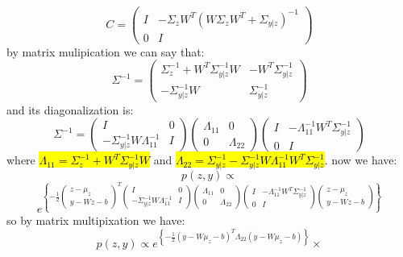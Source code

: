 \begin{qsolve}
\begin{qsolve}[]
		$$ C = \begin{pmatrix} I & -\Sigma_zW^T(W\Sigma_zW^T + \Sigma_{y|z})^{-1} \\ 0 & I \end{pmatrix}$$
		by matrix mulipication we can say that:
		$$\Sigma^{-1} = \begin{pmatrix}
			\Sigma_z^{-1} + W^T\Sigma_{y|z}^{-1}W & -W^T \Sigma_{y|z}^{-1} \\
			-\Sigma_{y|z}^{-1}W & \Sigma_{y|z}^{-1}
		\end{pmatrix}
		$$
		\splitqsolve[\splitqsolve]
		and its diagonalization is:
		$$\Sigma^{-1} = \begin{pmatrix}
			I & 0 \\
			-\Sigma_{y|z}^{-1}W\Lambda_{11}^{-1} & I
		\end{pmatrix} \begin{pmatrix}
			\Lambda_{11} & 0 \\
			0 & \Lambda_{22}
		\end{pmatrix} \begin{pmatrix}
			I & -\Lambda_{11}^{-1} W^T \Sigma_{y|z}^{-1} \\
			0 & I
		\end{pmatrix}$$
		where \hl{$\Lambda_{11} = \Sigma_z^{-1} + W^T\Sigma_{y|z}^{-1}W$} and \hl{$\Lambda_{22} = \Sigma_{y|z}^{-1}- \Sigma_{y|z}^{-1}W\Lambda_{11}^{-1}W^T\Sigma_{y|z}^{-1}$}.
		now we have:
		$$p(z,y)\propto$$
		$$  e^{\left\{-\frac{1}{2} \begin{pmatrix}
			z - \mu_z \\ y - Wz - b
		\end{pmatrix} ^T \begin{pmatrix}
			I & 0 \\ -\Sigma_{y|z}^{-1}W\Lambda_{11}^{-1} & I
		\end{pmatrix} \begin{pmatrix}
			\Lambda_{11} & 0 \\ 0 & \Lambda_{22}
		\end{pmatrix} \begin{pmatrix}
			I & -\Lambda_{11}^{-1} W^T \Sigma_{y|z}^{-1} \\
			0 & I
		\end{pmatrix} \begin{pmatrix}
			z - \mu_z \\ y - Wz - b
		\end{pmatrix}\right\}}$$
		so by matrix multipixation we have:
		$$p(z,y) \propto e^{\left\{-\frac{1}{2} (y-W\mu_z - b)^T \Lambda_{22} (y-W\mu_z - b)\right\}}\times$$

\end{qsolve}
\end{qsolve}
